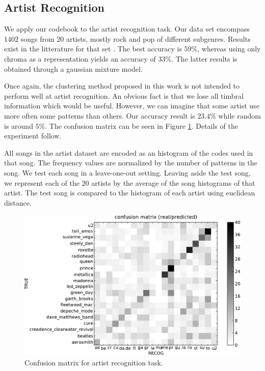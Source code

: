 \documentclass{article}
\begin{document}
\subsection{Artist Recognition}

We apply our codebook to the artist recognition task.
Our data set encompass $1402$ songs from $20$ artists, 
mostly rock and pop of different subgenres. Results exist in the
litterature for that set \cite{Ellis2007}. The best accuracy is
$59\%$, whereas using only chroma as a representation yields an
accuracy of $33\%$. The latter results is obtained through a
gaussian mixture model.

Once again, the clustering method proposed in this work is not
intended to perform well at artist recognition. An obvious fact is that
we lose all timbral information which would be useful. However, we can
imagine that some artist use more often some patterns than others.
Our accuracy result is $23.4\%$ while random
is around $5\%$. 
The confusion matrix can be seen in Figure \ref{fig:conf_mat}.
Details of the experiment follow.

All songs in the artist dataset are encoded as an histogram of the codes
used in that song. The frequency values are normalized by the number
of patterns in the song. We test each song in a leave-one-out setting.
Leaving aside the test song, we represent each of the $20$ artists by the 
average of
the song histograms of that artist. The test song is compared to
the histogram of each artist using euclidean distance.


\begin{figure}[htb]
\includegraphics[width=.9\columnwidth]{conf_mat_per_artist}
\caption{\small{Confusion matrix for artist recognition task.}}
\label{fig:conf_mat}
\end{figure}
\end{document}
